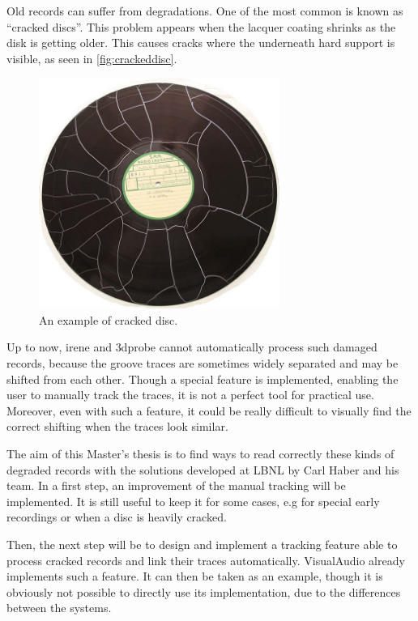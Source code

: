 Old records can suffer from degradations. One of the most common is known as ``cracked discs''. This problem appears when the lacquer coating shrinks as the disk is getting older. This causes cracks where the underneath hard support is visible, as seen in \autoref{fig:crackeddisc}.

\begin{figure}[!ht]
\centering
\includegraphics[width=0.7\textwidth]{images/cracked-disc}
\caption{An example of cracked disc.}
\label{fig:crackeddisc}
\end{figure}

Up to now, \gls{irene} and \gls{3dprobe} cannot automatically process such damaged records, because the groove traces are sometimes widely separated and may be shifted from each other. Though a special feature is implemented, enabling the user to manually track the traces, it is not a perfect tool for practical use. Moreover, even with such a feature, it could be really difficult to visually find the correct shifting when the traces look similar.

The aim of this Master's thesis is to find ways to read correctly these kinds of degraded records with the solutions developed at LBNL by Carl Haber and his team. In a first step, an improvement of the manual tracking will be implemented. It is still useful to keep it for some cases, e.g for special early recordings or when a disc is heavily cracked.

Then, the next step will be to design and implement a tracking feature able to process cracked records and link their traces automatically. VisualAudio already implements such a feature. It can then be taken as an example, though it is obviously not possible to directly use its implementation, due to the differences between the systems.

